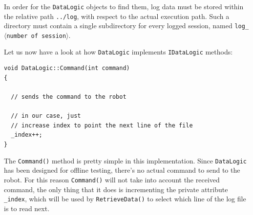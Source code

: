 %
In order for the \texttt{DataLogic} objects to find them, 
log data must be stored within the relative path 
\texttt{../log}, with respect to the actual execution path.
%
Such a directory must contain a single subdirectory for every 
logged session, named \texttt{log\_$\langle$number of session$\rangle$}. 
%

%
Let us now have a look at how \texttt{DataLogic} implements 
\texttt{IDataLogic} methods:
%
\begin{lstlisting}[caption={\texttt{DataLogic::Command() method}}, label={code:command_method}, frame=trBL]
void DataLogic::Command(int command) 
{

  // sends the command to the robot

  // in our case, just 
  // increase index to point the next line of the file
  _index++;
}
\end{lstlisting}
%
The \texttt{Command()} method is pretty simple in this 
implementation. Since \texttt{DataLogic} has been designed 
for offline testing, there's no actual command to send to the robot.
%
For this reason \texttt{Command()} will not take into account
the received command, the only thing that it does is 
incrementing the private attribute \texttt{\_index}, which 
will be used by \texttt{RetrieveData()} to select which line 
of the log file is to read next.
%
